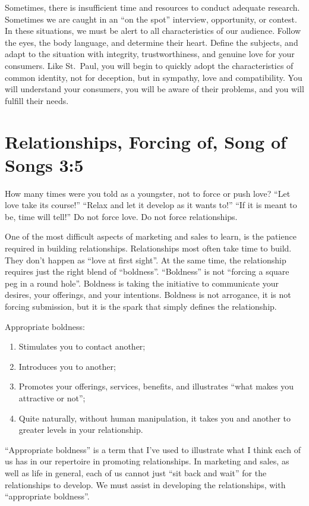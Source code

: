 \documentclass[12pt]{memoir}
\begin{document}
Sometimes, there is insufficient time and resources to conduct adequate
research. Sometimes we are caught in an ``on the spot'' interview,
opportunity, or contest. In these situations, we must be alert to
all characteristics of our audience. Follow the eyes, the body language,
and determine their heart. Define the subjects, and adapt to the situation
with integrity, trustworthiness, and genuine love for your consumers.
Like St.~Paul, you will begin to quickly adopt the characteristics
of common identity, not for deception, but in sympathy, love and compatibility.
You will understand your consumers, you will be aware of their problems,
and you will fulfill their needs. 

\section{Relationships, Forcing of, Song of Songs 3:5}

How many times were you told as a youngster, not to force or push
love? ``Let love take its course!'' ``Relax and let it develop
as it wants to!'' ``If it is meant to be, time will tell!'' Do
not force love. Do not force relationships.

One of the most difficult aspects of marketing and sales to learn,
is the patience required in building relationships. Relationships
most often take time to build. They don't happen as ``love at first
sight''. At the same time, the relationship requires just the right
blend of ``boldness''. ``Boldness'' is not ``forcing a square
peg in a round hole''. Boldness is taking the initiative to communicate
your desires, your offerings, and your intentions. Boldness is not
arrogance, it is not forcing submission, but it is the spark that
simply defines the relationship.

Appropriate boldness: 
\begin{enumerate}
\item Stimulates you to contact another;\label{stimulates-you-to-contact-another} 
\item Introduces you to another;\label{introduces-you-to-another}
\item Promotes your offerings, services, benefits, and illustrates ``what
makes you attractive or not'';
\item Quite naturally, without human manipulation, it takes you and another
to greater levels in your relationship. 
\end{enumerate}
``Appropriate boldness'' is a term that I've used to illustrate
what I think each of us has in our repertoire in promoting relationships.
In marketing and sales, as well as life in general, each of us cannot
just ``sit back and wait'' for the relationships to develop. We
must assist in developing the relationships, with ``appropriate boldness''.
\end{document}
